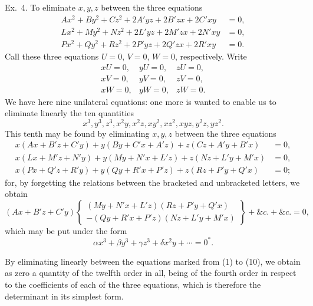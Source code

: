\documentclass[11pt]{article}
\newcommand{\sourcepage}[1]{\marginpar{\scriptsize p.~#1}}
\begin{document}
\medskip
\noindent Ex.~4. \quad To eliminate $x,y,z$ between the three equations
\begin{align*}
 Ax^2+By^2+Cz^2+2A'yz+2B'zx+2C'xy&=0,\\
 Lx^2+My^2+Nz^2+2L'yz+2M'zx+2N'xy&=0,\\
 Px^2+Qy^2+Rz^2+2P'yz+2Q'zx+2R'xy&=0.
\end{align*}
Call these three equations $U=0$, $V=0$, $W=0$, respectively. Write
\[
\begin{array}{lll}
xU=0,& yU=0,& zU=0,\\
xV=0,& yV=0,& zV=0,\\
xW=0,& yW=0,& zW=0.
\end{array}
\tag{1--9}
\]
We have here nine unilateral equations: one more is wanted to enable us to eliminate linearly the ten quantities
\[
 x^3,
y^3,
z^3,
x^2y,
x^2z,
xy^2,
xz^2,
xyz,
y^2z,
yz^2.
\]
This tenth may be found by eliminating $x,y,z$ between the three equations
\begin{align*}
 x(Ax+B'z+C'y)+y(By+C'x+A'z)+z(Cz+A'y+B'x)&=0,\\
 x(Lx+M'z+N'y)+y(My+N'x+L'z)+z(Nz+L'y+M'x)&=0,\\
 x(Px+Q'z+R'y)+y(Qy+R'x+P'z)+z(Rz+P'y+Q'x)&=0;
\end{align*}
for, by forgetting the relations between the bracketed and unbracketed letters, we obtain
\[
(Ax+B'z+C'y)
\left\{\begin{array}{l}
(My+N'x+L'z)(Rz+P'y+Q'x)\\[-1mm]
-(Qy+R'x+P'z)(Nz+L'y+M'x)
\end{array}\right\}+\&c.+\&c.=0,
\]
which may be put under the form
\begin{equation}
 \alpha x^3+\beta y^3+\gamma z^3+\delta x^2y+\cdots=0^*.\tag{10}
\end{equation}

\sourcepage{65}
By eliminating linearly between the equations marked from (1) to (10), we obtain as zero a quantity of the twelfth order in all, being of the fourth order in respect to the coefficients of each of the three equations, which is therefore the determinant in its simplest form.
\end{document}

